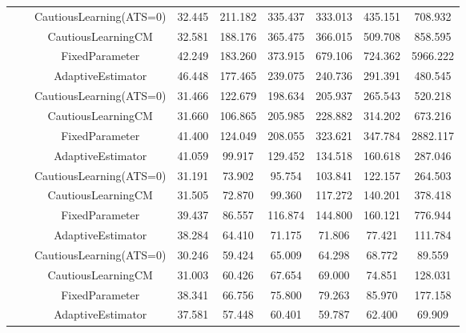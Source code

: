 \begin{table}[!h]
\begin{tabular}[t]{ccccccccc}
 &  & CautiousLearning(ATS=0) & 32.445 & 211.182 & 335.437 & 333.013 & 435.151 & 708.932\\

 &  & CautiousLearningCM & 32.581 & 188.176 & 365.475 & 366.015 & 509.708 & 858.595\\

 & \multirow[t]{-4}{*}{\centering\arraybackslash 0.25} & FixedParameter & 42.249 & 183.260 & 373.915 & 679.106 & 724.362 & 5966.222\\
\cmidrule{2-9}
 &  & AdaptiveEstimator & 46.448 & 177.465 & 239.075 & 240.736 & 291.391 & 480.545\\

 &  & CautiousLearning(ATS=0) & 31.466 & 122.679 & 198.634 & 205.937 & 265.543 & 520.218\\

 &  & CautiousLearningCM & 31.660 & 106.865 & 205.985 & 228.882 & 314.202 & 673.216\\

 & \multirow[t]{-4}{*}{\centering\arraybackslash 0.35} & FixedParameter & 41.400 & 124.049 & 208.055 & 323.621 & 347.784 & 2882.117\\
\cmidrule{2-9}
 &  & AdaptiveEstimator & 41.059 & 99.917 & 129.452 & 134.518 & 160.618 & 287.046\\

 &  & CautiousLearning(ATS=0) & 31.191 & 73.902 & 95.754 & 103.841 & 122.157 & 264.503\\

 &  & CautiousLearningCM & 31.505 & 72.870 & 99.360 & 117.272 & 140.201 & 378.418\\

 & \multirow[t]{-4}{*}{\centering\arraybackslash 0.50} & FixedParameter & 39.437 & 86.557 & 116.874 & 144.800 & 160.121 & 776.944\\
\cmidrule{2-9}
 &  & AdaptiveEstimator & 38.284 & 64.410 & 71.175 & 71.806 & 77.421 & 111.784\\

 &  & CautiousLearning(ATS=0) & 30.246 & 59.424 & 65.009 & 64.298 & 68.772 & 89.559\\

 &  & CautiousLearningCM & 31.003 & 60.426 & 67.654 & 69.000 & 74.851 & 128.031\\

 & \multirow[t]{-4}{*}{\centering\arraybackslash 0.75} & FixedParameter & 38.341 & 66.756 & 75.800 & 79.263 & 85.970 & 177.158\\
\cmidrule{2-9}
 &  & AdaptiveEstimator & 37.581 & 57.448 & 60.401 & 59.787 & 62.400 & 69.909\\


\end{tabular}
\end{table}
